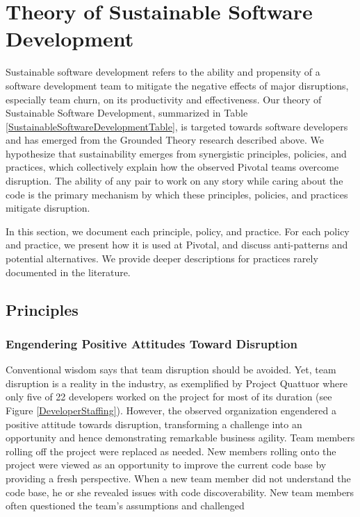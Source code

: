 \section{Theory of Sustainable Software Development}
\label{Theory}

Sustainable software development refers to the ability and propensity of a software development team to mitigate the negative effects of major disruptions, especially team churn, on its productivity and effectiveness. Our theory of Sustainable Software Development, summarized in Table \ref{SustainableSoftwareDevelopmentTable}, is targeted towards software developers and has emerged from the Grounded Theory research described above. We hypothesize that sustainability emerges from synergistic principles, policies, and practices, which collectively explain how the observed Pivotal teams overcome disruption. The ability of any pair to work on any story while caring about the code is the primary mechanism by which these principles, policies, and practices mitigate disruption. 

In this section, we document each principle, policy, and practice.  For each policy and practice, we present how it is used at Pivotal, and discuss anti-patterns and potential alternatives. We provide deeper descriptions for practices rarely documented in the literature.
\subsection{Principles}

\subsubsection{Engendering Positive Attitudes Toward Disruption}
Conventional wisdom says that team disruption should be avoided. Yet, team disruption is a reality in the industry, as exemplified by Project Quattuor where only five of 22 developers worked on the project for most of its duration (see Figure \ref{DeveloperStaffing}). However, the observed organization engendered a positive attitude towards disruption, transforming a challenge into an opportunity and hence demonstrating remarkable business agility. Team members rolling off the project were replaced as needed. New members rolling onto the project were viewed as an opportunity to improve the current code base by providing a fresh perspective. When a new team member did not understand the code base, he or she revealed issues with code discoverability. New team members often questioned the team’s assumptions and challenged  

